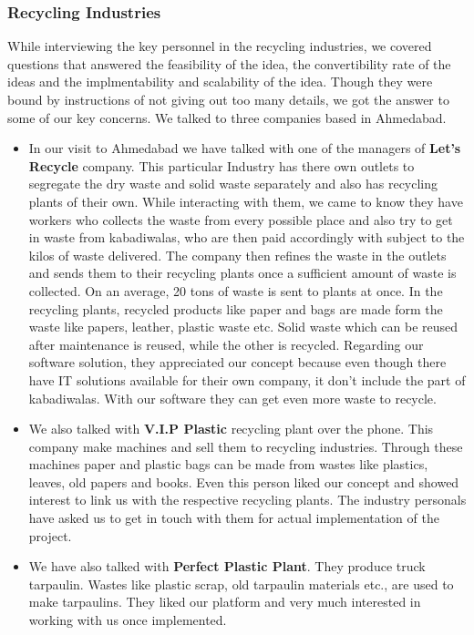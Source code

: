 \documentclass{article}
\begin{document}
\subsubsection{Recycling Industries}
While interviewing the key personnel in the recycling industries, we covered questions that answered the feasibility of the idea, the convertibility rate of the ideas and the implmentability and scalability of the idea. Though they were bound by instructions of not giving out too many details, we got the answer to some of our key concerns. We talked to three companies based in Ahmedabad.

\begin{itemize}
    \item In our visit to Ahmedabad we have talked with one of the managers of \textbf{Let's Recycle} company. This particular Industry has there own outlets to segregate the dry waste and solid waste separately and also has recycling plants of their own. While interacting with them, we came to know they have workers who collects the waste from every possible place and also try to get in waste from kabadiwalas, who are then paid accordingly with subject to the kilos of waste delivered. The company then refines the waste in the outlets and sends them to their recycling plants once a sufficient amount of waste is collected. On an average, 20 tons of waste is sent to plants at once. In the recycling plants, recycled products like paper and bags are made form the waste like papers, leather, plastic waste etc. Solid waste which can be reused after maintenance is reused, while the other is recycled. 
Regarding our software solution, they appreciated our concept because even though there have IT solutions available for their own company, it don't include the part of kabadiwalas. With our software they can get even more waste to recycle. 

\item We also talked with \textbf{V.I.P Plastic} recycling plant over the phone. This company make machines and sell them to recycling industries. Through these machines paper and plastic bags can be made from wastes like plastics, leaves, old papers and books. Even this person liked our concept and showed interest to link us with the respective recycling plants. The industry personals have asked us to get in touch with them for actual implementation of the project.

\item We have also talked with \textbf{Perfect Plastic Plant}. They produce truck tarpaulin. Wastes like plastic scrap, old tarpaulin materials etc., are used to make tarpaulins. They liked our platform and very much interested in working with us once
implemented.

\end{itemize}
\end{document}

